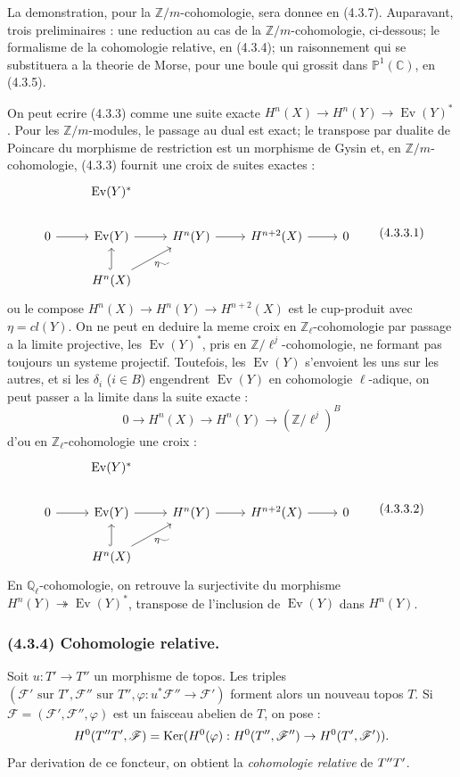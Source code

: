 \documentclass[12pt,a4paper]{article}
\theoremstyle{plain}
\theoremstyle{definition}
\theoremstyle{remark}
\DeclareMathOperator{\Ker}{Ker}
\DeclareMathOperator{\Ev}{Ev}
\let\mod\relax
\DeclareMathOperator{\mod}{mod}
\newcommand{\bbZ}{\mathbb{Z}}
\newcommand{\bbC}{\mathbb{C}}
\newcommand{\bbP}{\mathbb{P}}
\newcommand{\scrF}{\mathscr{F}}
\newcommand{\Zl}{\mathbb{Z}_\ell}
\newcommand{\Ql}{\mathbb{Q}_\ell}
\begin{document}
La demonstration, pour la $\bbZ/m$-cohomologie, sera donnee en (4.3.7). Auparavant, trois preliminaires : une reduction au cas de la $\bbZ/m$-cohomologie, ci-dessous; le formalisme de la cohomologie relative, en (4.3.4); un raisonnement qui se substituera a la theorie de Morse, pour une boule qui grossit dans $\bbP^1(\bbC)$, en (4.3.5).

On peut ecrire (4.3.3) comme une suite exacte $H^n(X) \to H^n(Y) \to \Ev(Y)^*$. Pour les $\bbZ/m$-modules, le passage au dual est exact; le transpose par dualite de Poincare du morphisme de restriction est un morphisme de Gysin et, en $\bbZ/m$-cohomologie, (4.3.3) fournit une croix de suites exactes :
\[
\begin{tikzcd}
& \Ev(Y)^* & \\
0 \arrow[r] & \Ev(Y) \arrow[r] & H^n(Y) \arrow[r] & H^{n+2}(X) \arrow[r] & 0 \\
& H^n(X) \arrow[u, hook] \arrow[ur, "\eta \smile"']
\end{tikzcd}
\tag{4.3.3.1}
\]
ou le compose $H^n(X) \to H^n(Y) \to H^{n+2}(X)$ est le cup-produit avec $\eta = cl(Y)$. On ne peut en deduire la meme croix en $\Zl$-cohomologie par passage a la limite projective, les $\Ev(Y)^*$, pris en $\bbZ/\ell^j$-cohomologie, ne formant pas toujours un systeme projectif. Toutefois, les $\Ev(Y)$ s'envoient les uns sur les autres, et si les $\delta_i$ ($i \in B$) engendrent $\Ev(Y)$ en cohomologie $\ell$-adique, on peut passer a la limite dans la suite exacte :
\[
0 \to H^n(X) \to H^n(Y) \to (\bbZ/\ell^j)^B
\]
d'ou en $\Zl$-cohomologie une croix :
\[
\begin{tikzcd}
& \Ev(Y)^* & \\
0 \arrow[r] & \Ev(Y) \arrow[r] & H^n(Y) \arrow[r] & H^{n+2}(X) \arrow[r] & 0 \\
& H^n(X) \arrow[u, hook] \arrow[ur, "\eta \smile"']
\end{tikzcd}
\tag{4.3.3.2}
\]
En $\Ql$-cohomologie, on retrouve la surjectivite du morphisme $H^n(Y) \twoheadrightarrow \Ev(Y)^*$, transpose de l'inclusion de $\Ev(Y)$ dans $H^n(Y)$.

\subsubsection*{\textup{(4.3.4)} Cohomologie relative.}

Soit $u : T' \to T''$ un morphisme de topos. Les triples $(\scrF' \text{ sur } T', \scrF'' \text{ sur } T'', \varphi : u^*\scrF'' \to \scrF')$ forment alors un nouveau topos $T$. Si $\scrF = (\scrF', \scrF'', \varphi)$ est un faisceau abelien de $T$, on pose :
\[
H^0(T'' \mod T', \scrF) = \Ker(H^0(\varphi) : H^0(T'', \scrF'') \to H^0(T', \scrF')).
\]
Par derivation de ce foncteur, on obtient la \emph{cohomologie relative} de $T'' \mod T'$.
\end{document}
